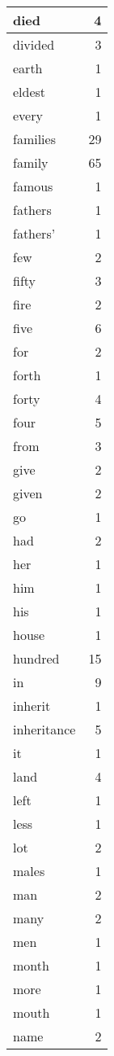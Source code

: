 \begin{center}
\begin{longtable}{l|r}
died & 4\\ \hline 
divided & 3\\ \hline 
earth & 1\\ \hline 
eldest & 1\\ \hline 
every & 1\\ \hline 
families & 29\\ \hline 
family & 65\\ \hline 
famous & 1\\ \hline 
fathers & 1\\ \hline 
fathers' & 1\\ \hline 
few & 2\\ \hline 
fifty & 3\\ \hline 
fire & 2\\ \hline 
five & 6\\ \hline 
for & 2\\ \hline 
forth & 1\\ \hline 
forty & 4\\ \hline 
four & 5\\ \hline 
from & 3\\ \hline 
give & 2\\ \hline 
given & 2\\ \hline 
go & 1\\ \hline 
had & 2\\ \hline 
her & 1\\ \hline 
him & 1\\ \hline 
his & 1\\ \hline 
house & 1\\ \hline 
hundred & 15\\ \hline 
in & 9\\ \hline 
inherit & 1\\ \hline 
inheritance & 5\\ \hline 
it & 1\\ \hline 
land & 4\\ \hline 
left & 1\\ \hline 
less & 1\\ \hline 
lot & 2\\ \hline 
males & 1\\ \hline 
man & 2\\ \hline 
many & 2\\ \hline 
men & 1\\ \hline 
month & 1\\ \hline 
more & 1\\ \hline 
mouth & 1\\ \hline 
name & 2\\ \hline 

\end{longtable}
\end{center}
